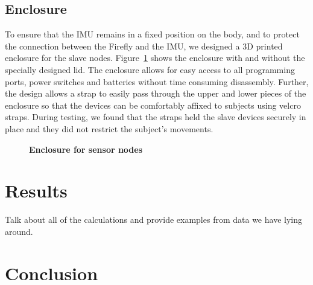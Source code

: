\documentclass[conference]{IEEEtran}
\begin{document}
\subsection{Enclosure} 
To ensure that the IMU remains in a fixed position on the body, and to protect the
connection between the Firefly and the IMU, we designed a 3D printed enclosure for the
slave nodes. Figure~\ref{fig:box} shows the enclosure with and without the specially designed
lid. The enclosure allows for easy access to all programming ports, power switches and
batteries without time consuming disassembly. Further, the design allows a strap to easily
pass through the upper and lower pieces of the enclosure so that the devices can be
comfortably affixed to subjects using velcro straps. During testing, we found that the
straps held the slave devices securely in place and they did not restrict the subject's
movements. 
\begin{figure}[h]
  \centering
  \label{fig:box}
  \caption{{\bf Enclosure for sensor nodes}}
\end{figure}

\section{Results}

Talk about all of the calculations and provide examples from data we have lying around. 

\section{Conclusion} 


\balance

\end{document}
